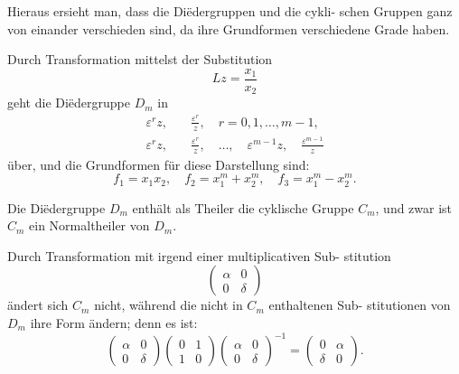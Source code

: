 \documentclass[12pt,a4paper]{article}
\theoremstyle{plain}
\theoremstyle{definition}
\theoremstyle{remark}
\begin{document}
Hieraus ersieht man, dass die Di\"edergruppen und die cykli-
schen Gruppen ganz von einander verschieden sind, da ihre
Grundformen verschiedene Grade haben.

Durch Transformation mittelst der Substitution
\[
Lz = \frac{x_1}{x_2}
\]
geht die Di\"edergruppe $D_m$ in
\begin{align*}
\varepsilon^r z,\quad &\frac{\varepsilon^r}{z},\quad r = 0, 1, \ldots, m-1,\\
\varepsilon^r z,\quad &\frac{\varepsilon^r}{z},\quad \ldots,\quad \varepsilon^{m-1}z,\quad \frac{\varepsilon^{m-1}}{z}
\end{align*}
\"uber, und die Grundformen f\"ur diese Darstellung sind:
\[
f_1 = x_1 x_2,\quad f_2 = x_1^m + x_2^m,\quad f_3 = x_1^m - x_2^m.
\]

Die Di\"edergruppe $D_m$ enth\"alt als Theiler die cyklische
Gruppe $C_m$, und zwar ist $C_m$ ein Normaltheiler von $D_m$.

Durch Transformation mit irgend einer multiplicativen Sub-
stitution
\[
\begin{pmatrix}\alpha & 0\\ 0 & \delta\end{pmatrix}
\]
\"andert sich $C_m$ nicht, w\"ahrend die nicht in $C_m$ enthaltenen Sub-
stitutionen von $D_m$ ihre Form \"andern; denn es ist:
\[
\begin{pmatrix}\alpha & 0\\ 0 & \delta\end{pmatrix}
\begin{pmatrix}0 & 1\\ 1 & 0\end{pmatrix}
\begin{pmatrix}\alpha & 0\\ 0 & \delta\end{pmatrix}^{-1}
=
\begin{pmatrix}0 & \alpha\\ \delta & 0\end{pmatrix}.
\]
\end{document}
